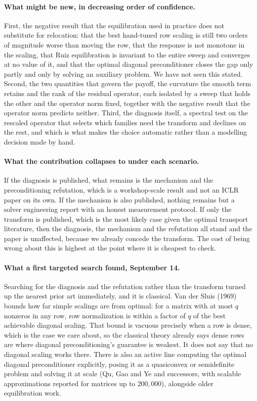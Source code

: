 \documentclass[11pt]{article}
\begin{document}
\paragraph{What might be new, in decreasing order of confidence.}
First, the negative result that the equilibration used in practice does not
substitute for relocation: that the best hand-tuned row scaling is still two
orders of magnitude worse than moving the row, that the response is not
monotone in the scaling, that Ruiz equilibration is invariant to the entire
sweep and converges at no value of it, and that the optimal diagonal
preconditioner closes the gap only partly and only by solving an auxiliary
problem. We have not seen this stated. Second, the two
quantities that govern the payoff, the curvature the smooth term retains and
the rank of the residual operator, each isolated by a sweep that holds the
other and the operator norm fixed, together with the negative result that the
operator norm predicts neither. Third, the diagnosis itself, a spectral test
on the rescaled operator that selects which families need the transform and
declines on the rest, and which is what makes the choice automatic rather
than a modelling decision made by hand.

\paragraph{What the contribution collapses to under each scenario.}
If the diagnosis is published, what remains is the mechanism and the
preconditioning refutation, which is a workshop-scale result and not an ICLR
paper on its own. If the mechanism is also published, nothing remains but a
solver engineering report with an honest measurement protocol. If only the
transform is published, which is the most likely case given the optimal
transport literature, then the diagnosis, the mechanism and the refutation
all stand and the paper is unaffected, because we already concede the
transform. The cost of being wrong about this is highest at the point where
it is cheapest to check.

\paragraph{What a first targeted search found, September 14.}
Searching for the diagnosis and the refutation rather than the transform
turned up the nearest prior art immediately, and it is classical. Van der
Sluis (1969) bounds how far simple scalings are from optimal: for a matrix
with at most $q$ nonzeros in any row, row normalization is within a factor of
$q$ of the best achievable diagonal scaling. That bound is vacuous precisely
when a row is dense, which is the case we care about, so the classical theory
already says dense rows are where diagonal preconditioning's guarantee is
weakest. It does not say that no diagonal scaling works there. There is
also an active line computing the optimal diagonal preconditioner explicitly,
posing it as a quasiconvex or semidefinite problem and solving it at scale
(Qu, Gao and Ye and successors, with scalable approximations reported for
matrices up to $200{,}000$), alongside older equilibration work.
\end{document}

